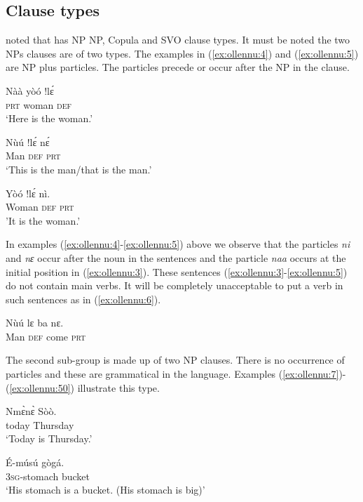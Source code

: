 \documentclass[output=paper
,newtxmath
,modfonts
,nonflat]{langsci/langscibook}
\begin{document}
\subsection{\label{sec:ollennu:1.3} Clause types}

\citet{Dakubu2003} noted that  has NP NP, Copula and SVO clause types. It must be noted the two NPs clauses are of two types. The examples in (\ref{ex:ollennu:4}) and (\ref{ex:ollennu:5}) are NP plus particles. The particles precede or occur after the NP in the clause.

\ea \label{ex:ollennu:3}
\gll N\`a\`a y\`o\'o !l\'ɛ \\
\textsc{prt} woman \textsc{def}\\
\glt `Here is the woman.'
\z

\ea \label{ex:ollennu:4}
	\gll N\`u\'u !l\'ɛ n\'ɛ\\
	Man \textsc{def} \textsc{prt}\\
\glt `This is the man/that is the man.'
\z

\ea \label{ex:ollennu:5}
\gll Y\`o\'o !l\'ɛ n\`i.\\
Woman \textsc{def} \textsc{prt}\\
\glt 'It is the woman.'
\z


In examples  (\ref{ex:ollennu:4}-\ref{ex:ollennu:5}) above we observe that the particles \textit{ni} and \textit{nɛ} occur after the noun in the sentences and the particle \textit{naa} occurs at the initial position in (\ref{ex:ollennu:3}). These sentences (\ref{ex:ollennu:3}-\ref{ex:ollennu:5}) do not contain main verbs. It will be completely unacceptable to put a verb in such sentences as in (\ref{ex:ollennu:6}).

\ea \label{ex:ollennu:6}\gll {*}N\`u\'u lɛ ba nɛ.\\
Man \textsc{def} come \textsc{prt}\\
\z

The second sub-group is made up of two NP clauses. There is no occurrence of particles and these are grammatical in the language. Examples (\ref{ex:ollennu:7})-(\ref{ex:ollennu:50}) illustrate this type.

\ea \label{ex:ollennu:7}
\gll Nm\`ɛn\`ɛ S\`o\`o.\\
today Thursday\\
\glt `Today is Thursday.'
\z

\ea \label{ex:ollennu:50}
\gll \'E-m\'us\'u g\`og\'a.\\
3\textsc{sg}-stomach bucket\\
\glt `His stomach is a bucket. (His stomach is big)'
\z
\end{document}
